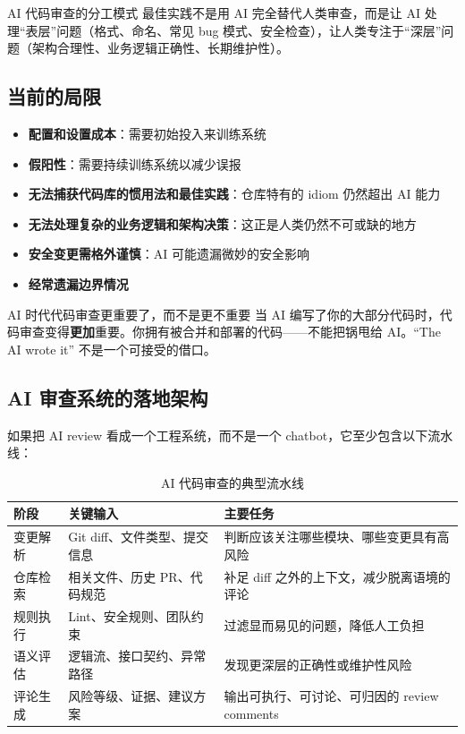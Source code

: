 \documentclass[a4paper]{article}
\begin{document}
\begin{knowledgebox}{AI 代码审查的分工模式}
最佳实践不是用 AI 完全替代人类审查，而是让 AI 处理``表层''问题（格式、命名、常见 bug 模式、安全检查），让人类专注于``深层''问题（架构合理性、业务逻辑正确性、长期维护性）。
\end{knowledgebox}

\subsection{当前的局限}

\begin{itemize}
    \item \textbf{配置和设置成本}：需要初始投入来训练系统
    \item \textbf{假阳性}：需要持续训练系统以减少误报
    \item \textbf{无法捕获代码库的惯用法和最佳实践}：仓库特有的 idiom 仍然超出 AI 能力
    \item \textbf{无法处理复杂的业务逻辑和架构决策}：这正是人类仍然不可或缺的地方
    \item \textbf{安全变更需格外谨慎}：AI 可能遗漏微妙的安全影响
    \item \textbf{经常遗漏边界情况}
\end{itemize}

\begin{warningbox}{AI 时代代码审查更重要了，而不是更不重要}
当 AI 编写了你的大部分代码时，代码审查变得\textbf{更加}重要。你拥有被合并和部署的代码——不能把锅甩给 AI。``The AI wrote it'' 不是一个可接受的借口。
\end{warningbox}

\subsection{AI 审查系统的落地架构}

如果把 AI review 看成一个工程系统，而不是一个 chatbot，它至少包含以下流水线：

\begin{table}[H]
\centering
\begin{tabular}{p{} p{} p{}}
\toprule
阶段 & 关键输入 & 主要任务 \\
\midrule
变更解析 & Git diff、文件类型、提交信息 & 判断应该关注哪些模块、哪些变更具有高风险 \\
仓库检索 & 相关文件、历史 PR、代码规范 & 补足 diff 之外的上下文，减少脱离语境的评论 \\
规则执行 & Lint、安全规则、团队约束 & 过滤显而易见的问题，降低人工负担 \\
语义评估 & 逻辑流、接口契约、异常路径 & 发现更深层的正确性或维护性风险 \\
评论生成 & 风险等级、证据、建议方案 & 输出可执行、可讨论、可归因的 review comments \\
\bottomrule
\end{tabular}
\caption{AI 代码审查的典型流水线}
\end{table}
\end{document}
